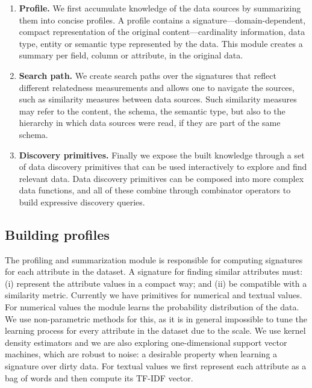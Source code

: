 \begin{enumerate}
\item {\bf Profile.} We first accumulate knowledge of the data sources by summarizing them
into concise profiles. A profile contains a signature---domain-dependent,
compact representation of the original content---cardinality information, data
type, entity or semantic type represented by the data. This module creates a
summary per field, \ie column or attribute, in the original data.
\item {\bf Search path.} We create search paths over the signatures that reflect different relatedness
measurements and allows one to navigate the sources, such as similarity measures
between data sources. Such similarity measures may refer to the content, the
schema, the semantic type, but also to the hierarchy in which data sources were
read, \ie if they are part of the same schema.
\item {\bf Discovery primitives.} Finally we expose the built knowledge through a set of data discovery
primitives that can be used interactively to explore and find relevant data.
Data discovery primitives can be composed into more complex data functions, and
all of these combine through combinator operators to build expressive discovery
queries.
\end{enumerate}


\subsection{Building profiles}

The profiling and summarization module is responsible
for computing signatures for each attribute in the dataset. A signature for
finding similar attributes must: (i) represent the attribute values in a compact
way; and (ii) be compatible with a similarity metric. Currently we have
primitives for numerical and textual values. For numerical values the module
learns the probability distribution of the data. We use non-parametric methods
for this, as it is in general impossible to tune the learning process for every
attribute in the dataset due to the scale. We use kernel density estimators and
we are also exploring one-dimensional support vector machines, which are robust
to noise: a desirable property when learning a signature over dirty data. For
textual values we first represent each attribute as a bag of words and then
compute its TF-IDF vector.

